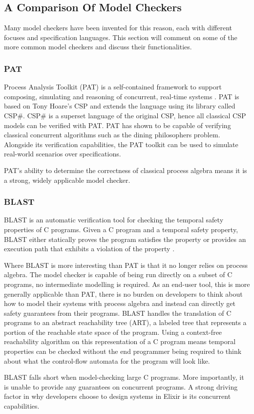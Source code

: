 \subsection[]{A Comparison Of Model Checkers}
Many model checkers have been invented for this reason, each with different focuses and specification languages. This section will comment on some of the more common model checkers and discuss their functionalities. \\
\subsubsection*{\textbf{PAT}}
Process Analysis Toolkit (PAT) is a self-contained framework to support composing, simulating and reasoning of concurrent, real-time systems \cite{pat}. PAT is based on Tony Hoare's CSP and extends the language using its library called CSP\#. CSP\# is a superset language of the original CSP, hence all classical CSP models can be verified with PAT. PAT has shown to be capable of verifying classical concurrent algorithms such as the dining philosophers problem. Alongside its verification capabilities, the PAT toolkit can be used to simulate real-world scenarios over specifications. 
\par
PAT's ability to determine the correctness of classical process algebra means it is a strong, widely applicable model checker.

\subsubsection*{\textbf{BLAST}}
BLAST is an automatic verification tool for checking the temporal safety properties of C programs. Given a C program and a temporal safety property, BLAST either statically proves the program satisfies the property or provides an execution path that exhibits a violation of the property \cite{blast}.
\par
Where BLAST is more interesting than PAT is that it no longer relies on process algebra. The model checker is capable of being run directly on a subset of C programs, no intermediate modelling is required. As an end-user tool, this is more generally applicable than PAT, there is no burden on developers to think about how to model their systems with process algebra and instead can directly get safety guarantees from their programs. BLAST handles the translation of C programs to an abstract reachability tree (ART), a labeled tree that represents a portion of the reachable state space of the program. Using a context-free reachability algorithm on this representation of a C program means temporal properties can be checked without the end programmer being required to think about what the control-flow automata for the program will look like.
\par
BLAST falls short when model-checking large C programs. More importantly, it is unable to provide any guarantees on concurrent programs. A strong driving factor in why developers choose to design systems in Elixir is its concurrent capabilities. 

